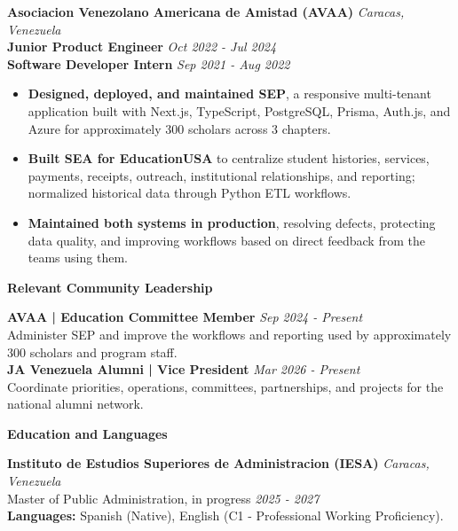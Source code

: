 \documentclass[10pt]{article}
\newcommand{\sectiontitle}[1]{%
    \vspace{4pt}
    \begin{center}
        \textbf{#1}
    \end{center}
    \vspace{-5pt}
}
\begin{document}
\vspace{2pt}
\textbf{Asociacion Venezolano Americana de Amistad (AVAA)} \hfill \textit{Caracas, Venezuela} \\
\textbf{Junior Product Engineer} \hfill \textit{Oct 2022 - Jul 2024} \\
\textbf{Software Developer Intern} \hfill \textit{Sep 2021 - Aug 2022}
\begin{itemize}
    \item \textbf{Designed, deployed, and maintained SEP}, a responsive multi-tenant application built with Next.js, TypeScript, PostgreSQL, Prisma, Auth.js, and Azure for approximately 300 scholars across 3 chapters.
    \item \textbf{Built SEA for EducationUSA} to centralize student histories, services, payments, receipts, outreach, institutional relationships, and reporting; normalized historical data through Python ETL workflows.
    \item \textbf{Maintained both systems in production}, resolving defects, protecting data quality, and improving workflows based on direct feedback from the teams using them.
\end{itemize}

\sectiontitle{Relevant Community Leadership}
\textbf{AVAA | Education Committee Member} \hfill \textit{Sep 2024 - Present} \\
Administer SEP and improve the workflows and reporting used by approximately 300 scholars and program staff. \\
\textbf{JA Venezuela Alumni | Vice President} \hfill \textit{Mar 2026 - Present} \\
Coordinate priorities, operations, committees, partnerships, and projects for the national alumni network.

\sectiontitle{Education and Languages}
\textbf{Instituto de Estudios Superiores de Administracion (IESA)} \hfill \textit{Caracas, Venezuela} \\
Master of Public Administration, in progress \hfill \textit{2025 - 2027} \\
\textbf{Languages:} Spanish (Native), English (C1 - Professional Working Proficiency).
\end{document}
